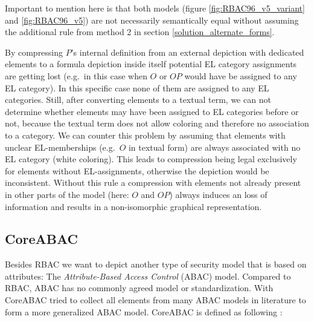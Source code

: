 \documentclass[twoside, openright, 12pt]{book}
\begin{document}
\noindent
Important to mention here is that both models (figure \ref{fig:RBAC96_v5_variant} and \ref{fig:RBAC96_v5}) are not necessarily semantically equal without assuming the additional rule from method 2 in section \ref{solution_alternate_forms}.

By compressing $P$'s internal definition from an external depiction with dedicated elements to a formula depiction inside itself potential EL category assignments are getting lost (e.g.\ in this case when $O$ or $OP$ would have be assigned to any EL category).
In this specific case none of them are assigned to any EL categories.
Still, after converting elements to a textual term, we can not determine whether elements may have been assigned to EL categories before or not, because the textual term does not allow coloring and therefore no association to a category.
We can counter this problem by assuming that elements with unclear EL-memberships (e.g.\ $O$ in textual form) are always associated with no EL category (white coloring).
This leads to compression being legal exclusively for elements without EL-assignments, otherwise the depiction would be inconsistent.
Without this rule a compression with elements not already present in other parts of the model (here: $O$ and $OP$) always induces an loss of information and results in a non-isomorphic graphical representation.

%



\subsection{CoreABAC}
Besides RBAC we want to depict another type of security model that is based on attributes: The \textit{Attribute-Based Access Control} (ABAC) model.
Compared to RBAC, ABAC has no commonly agreed model or standardization.
With CoreABAC \cite{Servos17} tried to collect all elements from many ABAC models in literature to form a more generalized ABAC model.
CoreABAC is defined as following \citep{Amthor18, Servos17}:
\end{document}
